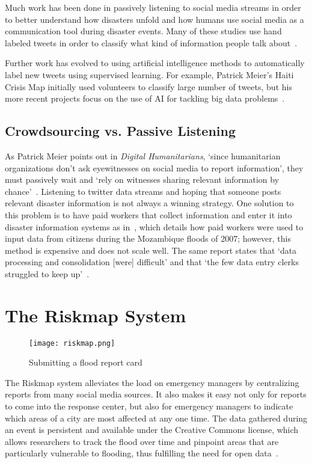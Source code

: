 Much work has been done in passively listening to social media streams in order
to better understand how disasters unfold and how humans use social media as a
communication tool during disaster events. Many of these studies use hand
labeled tweets in order to classify what kind of information people talk
about~\cite{alamTwitterTaleThree2018}.

Further work has evolved to using artificial intelligence methods to
automatically label new tweets using supervised learning. For example, Patrick
Meier's Haiti Crisis Map initially used volunteers to classify large number of
tweets, but his more recent projects focus on the use of AI for tackling big
data problems~\cite{meierDigitalHumanitariansHow2015}.
\subsection{Crowdsourcing vs. Passive Listening} 
As Patrick Meier points out in \textit{Digital Humanitarians}, `since
humanitarian organizations don't ask eyewitnesses on social media to report
information', they must passively wait and `rely on witnesses sharing relevant
information by chance'~\cite{meierDigitalHumanitariansHow2015}. Listening to
twitter data streams and hoping that someone posts relevant disaster information
is not always a winning strategy. One solution to this problem is to have paid
workers that collect information and enter it into disaster information systems
as in~\cite{aminDataNaturalDisasters2008}, which details how paid workers were
used to input data from citizens during the Mozambique floods of 2007; however,
this method is expensive and does not scale well. The same report states that
`data processing and consolidation [were] difficult' and that `the few data
entry clerks struggled to keep up'~\cite{aminDataNaturalDisasters2008}.

\section{The Riskmap System}\label{chap1:riskmap}
  \begin{figure} \texttt{[image: riskmap.png]}
  \caption{Submitting a flood report card}\label{fig:cards} \end{figure}
  The Riskmap system alleviates the load on
  emergency managers by centralizing reports from many social media
  sources. It also makes it easy not only for reports to come into the
  response center, but also for emergency managers to indicate which areas
  of a city are most affected at any one time. The data gathered during an
  event is persistent and available under the Creative Commons license,
  which allows researchers to track the flood over time and pinpoint areas
  that are particularly vulnerable to flooding, thus fulfilling the need
  for open data~\cite{PhilippinesPDCCollaborate,
  antaranews.comBNPBPetaBencanaId}.

